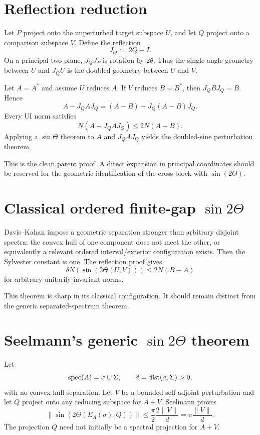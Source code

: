 \section{Reflection reduction}

Let $P$ project onto the unperturbed target subspace $U$, and let $Q$ project onto a comparison subspace $V$. Define the reflection
\[
  J_Q:=2Q-I.
\]
On a principal two-plane, $J_QJ_P$ is rotation by $2\theta$. Thus the single-angle geometry between $U$ and $J_QU$ is the doubled geometry between $U$ and $V$.

Let $A=A^*$ and assume $U$ reduces $A$. If $V$ reduces $B=B^*$, then $J_QBJ_Q=B$. Hence
\[
  A-J_QAJ_Q
  =(A-B)-J_Q(A-B)J_Q.
\]
Every UI norm satisfies
\[
  N(A-J_QAJ_Q)\le2N(A-B).
\]
Applying a $\sin\Theta$ theorem to $A$ and $J_QAJ_Q$ yields the doubled-sine perturbation theorem.

This is the clean parent proof. A direct expansion in principal coordinates should be reserved for the geometric identification of the cross block with $\sin(2\Theta)$.

\section{Classical ordered finite-gap $\sin 2\Theta$}

Davis--Kahan impose a geometric separation stronger than arbitrary disjoint spectra: the convex hull of one component does not meet the other, or equivalently a relevant ordered interval/exterior configuration exists. Then the Sylvester constant is one. The reflection proof gives
\[
  \delta N(\sin(2\Theta(U,V)))
  \le2N(B-A)
\]
for arbitrary unitarily invariant norms.

This theorem is sharp in its classical configuration. It should remain distinct from the generic separated-spectrum theorem.

\section{Seelmann's generic $\sin 2\Theta$ theorem}

Let
\[
  \operatorname{spec}(A)=\sigma\cup\Sigma,
  \qquad
  d=\operatorname{dist}(\sigma,\Sigma)>0,
\]
with no convex-hull separation. Let $V$ be a bounded self-adjoint perturbation and let $Q$ project onto any reducing subspace for $A+V$. Seelmann proves
\[
  \|\sin(2\Theta(E_A(\sigma),Q))\|
  \le \frac{\pi}{2}\frac{2\|V\|}{d}
  =\pi\frac{\|V\|}{d}.
\]
The projection $Q$ need not initially be a spectral projection for $A+V$.

